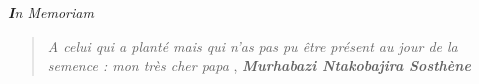 \thispagestyle{empty}
\begin{center}
	 {\Large\textit{ \textbf In Memoriam}}
\end{center}
\vspace*{\fill} 
\begin{quote} 
	\centering 
	{\itshape A celui qui a planté mais qui n'as pas pu être présent au jour de la semence :   mon très cher papa }, \textit{\textbf{Murhabazi Ntakobajira Sosthène }}
\end{quote}
\vspace*{\fill}